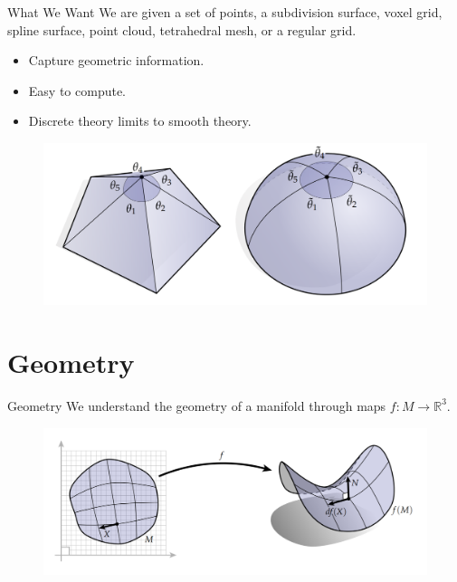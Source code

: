 \documentclass[UKenglish]{beamer}
\newcommand{\R}{\mathbb{R}}
\begin{document}
\begin{frame}{What We Want}
We are given a set of points, a subdivision surface, voxel grid, spline surface, point cloud, tetrahedral mesh, or a regular grid.
\vspace*{.25cm}
    \begin{itemize}
        \item Capture geometric information.
        \item Easy to compute.
        \item Discrete theory limits to smooth theory.
    \end{itemize}
    \vspace*{.25cm}
    \begin{figure}
        \centering
        \includegraphics[width=.6\textwidth]{Figures/discrete_smooth.png}
    \end{figure}
\end{frame}

\section{Geometry}

\begin{frame}{Geometry}
    We understand the geometry of a manifold through maps $f\colon M \to \R^3$.
    \vspace*{1cm}
    \begin{figure}
        \centering
        \includegraphics[width=\textwidth]{Figures/geometry_1.png}
    \end{figure}
\end{frame}
\end{document}
